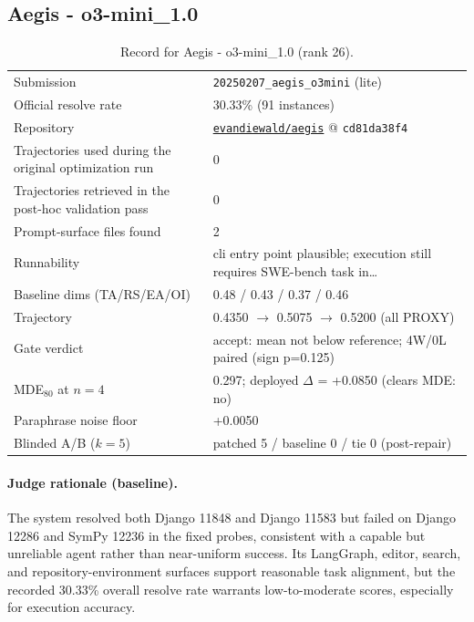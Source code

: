 \subsection{Aegis - o3-mini\_1.0}
\label{app:agent26}
\begin{table}[H]\centering\scriptsize
\caption{Record for Aegis - o3-mini\_1.0 (rank 26).}
\begin{tabular}{lp{8.2cm}}\toprule
Submission & \texttt{20250207\_\allowbreak{}aegis\_\allowbreak{}o3mini} (lite) \\
Official resolve rate & 30.33\% (91 instances) \\
Repository & \href{https://github.com/evandiewald/aegis}{\texttt{evandiewald/aegis}} @ \texttt{cd81da38f4} \\
Trajectories used during the original optimization run & 0 \\
Trajectories retrieved in the post-hoc validation pass & 0 \\
Prompt-surface files found & 2 \\
Runnability & cli entry point plausible; execution still requires SWE-bench task in\ldots{} \\
Baseline dims (TA/RS/EA/OI) & 0.48 / 0.43 / 0.37 / 0.46 \\
Trajectory & 0.4350 $\to$ 0.5075 $\to$ 0.5200 (all PROXY) \\
Gate verdict & accept: mean not below reference; 4W/0L paired (sign p=0.125) \\
MDE$_{80}$ at $n{=}4$ & 0.297; deployed $\Delta$ = +0.0850 (clears MDE: no) \\
Paraphrase noise floor & +0.0050 \\
Blinded A/B ($k{=}5$) & patched 5 / baseline 0 / tie 0 (post-repair) \\
\bottomrule\end{tabular}\end{table}
\paragraph{Judge rationale (baseline).}
The system resolved both Django 11848 and Django 11583 but failed on Django 12286 and SymPy 12236 in the fixed probes, consistent with a capable but unreliable agent rather than near-uniform success. Its LangGraph, editor, search, and repository-environment surfaces support reasonable task alignment, but the recorded 30.33\% overall resolve rate warrants low-to-moderate scores, especially for execution accuracy.
